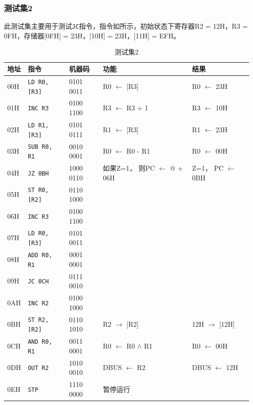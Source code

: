 \documentclass[lang=cn,11pt,a4paper,cite=authornum]{paper}
\begin{document}
\subsubsection{测试集2}

此测试集主要用于测试\texttt{JC}指令，指令如所示，初始状态下寄存器R2 = 12H，R3 = 0FH，存储器[0FH] = 23H，[10H] = 23H，[11H] = EFH。

\begin{table}[!htbp]
    \centering
    \caption{测试集2\label{tab:base_test_2}}
    \begin{tabular}{|l|l|l|l|l|}
        \hline 
        地址 & 指令 & 机器码  &  功能 & 结果 \\ \hline 
        00H & \texttt{LD R0, [R3]} & 0101 0011  &  R0 $\leftarrow$ [R3] & R0 $\leftarrow$ 23H \\ \hline 
        01H & \texttt{INC R3} & 0100 1100  &  R3 $\leftarrow$ R3 + 1 & R3 $\leftarrow$ 10H \\ \hline 
        02H & \texttt{LD R1, [R3]} & 0101 0111  &  R1 $\leftarrow$ [R3]  & R1 $\leftarrow$ 23H \\ \hline 
        03H & \texttt{SUB R0, R1} & 0010 0001  &  R0 $\leftarrow$ R0 - R1 & R0 $\leftarrow$ 00H \\ \hline 
        04H & \texttt{JZ 0BH} & 1000 0110  &  \makecell[l]{如果Z=1，\\则PC $\leftarrow$ @ + 06H} & \makecell[l]{Z=1，\\PC $\leftarrow$ 0BH} \\ \hline 
        05H & \texttt{ST R0, [R2]} & 0110 1000  &   &  \\ \hline 
        06H & \texttt{INC R3} & 0100 1100  &   &  \\ \hline 
        07H & \texttt{LD R0, [R3]} & 0101 0011  &   &  \\ \hline 
        08H & \texttt{ADD R0, R1} & 0001 0001  &   &  \\ \hline 
        09H & \texttt{JC 0CH} & 0111 0010  &   &  \\ \hline 
        0AH & \texttt{INC R2} & 0100 1000  &   &  \\ \hline 
        0BH & \texttt{ST R2, [R2]} & 0110 1010  &  R2 $\rightarrow$ [R2] & 12H $\rightarrow$ [12H] \\ \hline 
        0CH & \texttt{AND R0, R1} & 0011 0001  &  R0 $\leftarrow$ R0 $\wedge$ R1 & R0 $\leftarrow$ 00H \\ \hline 
        0DH & \texttt{OUT R2} & 1010 0010  &  DBUS $\leftarrow$ R2 & DBUS $\leftarrow$ 12H \\ \hline 
        0EH & \texttt{STP} & 1110 0000  &  暂停运行 &  \\ \hline
    \end{tabular}
\end{table}
\end{document}

